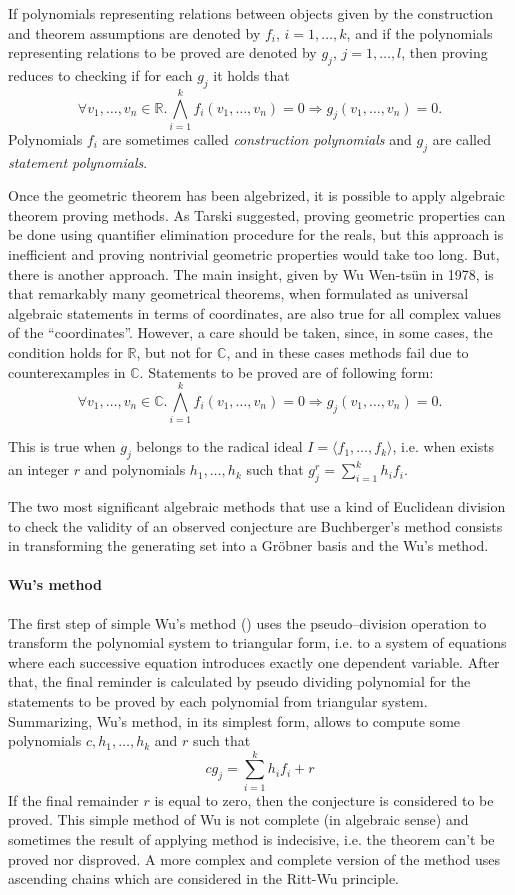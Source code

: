 \documentclass[final,1p,times,authoryear]{elsarticle}
\begin{document}
If polynomials representing relations between objects given by the
construction and theorem assumptions are denoted by $f_i$, $i = 1,
\ldots, k$, and if the polynomials representing relations to be proved
are denoted by $g_j$, $j = 1, \ldots, l$, then proving reduces to
checking if for each $g_j$ it holds that
$$\forall v_1, \ldots, v_n \in \mathbb{R}. \bigwedge_{i = 1}^{k}
f_i(v_1, \ldots, v_n) = 0 \Longrightarrow g_j(v_1, \ldots, v_n) = 0.$$
Polynomials $f_i$ are sometimes called \emph{construction polynomials}
and $g_j$ are called \emph{statement polynomials}.

Once the geometric theorem has been algebrized, it is possible to
apply algebraic theorem proving methods.  As Tarski suggested, proving
geometric properties can be done using quantifier elimination
procedure for the reals, but this approach is inefficient and proving
nontrivial geometric properties would take too long. But, there is
another approach. The main insight, given by Wu Wen-ts\"un in 1978, is
that remarkably many geometrical theorems, when formulated as
universal algebraic statements in terms of coordinates, are also true
for all complex values of the “coordinates”. However, a care should be
taken, since, in some cases, the condition holds for $\mathbb{R}$, but
not for $\mathbb{C}$, and in these cases methods fail due to
counterexamples in $\mathbb{C}$. Statements to be proved are of
following form:
$$\forall v_1, \ldots, v_n \in \mathbb{C}. \bigwedge_{i = 1}^{k} f_i(v_1, \ldots, v_n) = 0 \Longrightarrow g_j(v_1, \ldots, v_n) = 0.$$

This is true when $g_j$ belongs to the radical ideal $I = \langle f_1,
\ldots, f_k \rangle$, i.e. when exists an integer $r$ and polynomials
$h_1, \ldots, h_k$ such that $g_j^r = \sum_{i=1}^k h_if_i$.

The two most significant algebraic methods that use a kind of
Euclidean division to check the validity of an observed conjecture are
Buchberger's method consists in transforming the generating set into a
Gr\"obner basis and the Wu's method.

\paragraph{Wu's method}

The first step of simple Wu's method (\cite{wu}) uses the
pseudo--division operation to transform the polynomial system to
triangular form, i.e. to a system of equations where each successive
equation introduces exactly one dependent variable. After that, the
final reminder is calculated by pseudo dividing polynomial for the
statements to be proved by each polynomial from triangular system.
Summarizing, Wu's method, in its simplest form, allows to compute some
polynomials $c, h_1, \ldots, h_k$ and $r$ such that
$$cg_j = \sum_{i=1}^{k}h_if_i + r$$ If the final remainder $r$ is
equal to zero, then the conjecture is considered to be proved. This
simple method of Wu is not complete (in algebraic sense) and
sometimes the result of applying method is indecisive, i.e. the
theorem can't be proved nor disproved. A more complex and complete
version of the method uses ascending chains which are considered in
the Ritt-Wu principle.
\end{document}
